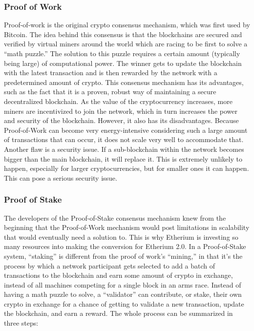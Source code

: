 \subsubsection{Proof of Work}

Proof-of-work is the original crypto consensus mechanism, which was first used by Bitcoin. The idea behind this consensus is that the blockchains are secured and verified by virtual miners around the world which are racing to be first to solve a “math puzzle.” The solution to this puzzle requires a certain amount (typically being large) of computational power. The winner gets to update the blockchain with the latest transaction and is then rewarded by the network with a predetermined amount of crypto. This consensus mechanism has its advantages, such as the fact that it is a proven, robust way of maintaining a secure decentralized blockchain. As the value of the cryptocurrency increases, more miners are incentivized to join the network, which in turn increases the power and security of the blockchain. However, it also has its disadvantages. Because Proof-of-Work can become very energy-intensive considering such a large amount of transactions that can occur, it does not scale very well to accommodate that. Another flaw is a security issue. If a sub-blockchain within the network becomes bigger than the main blockchain, it will replace it. This is extremely unlikely to happen, especially for larger cryptocurrencies, but for smaller ones it can happen. This can pose a serious security issue.

\subsubsection{Proof of Stake}

The developers of the Proof-of-Stake consensus mechanism knew from the beginning that the Proof-of-Work mechanism would post limitations in scalability that would eventually need a solution to. This is  why Etherium is investing so many resources into making the conversion for Etherium 2.0. In a Proof-of-Stake system, “staking” is different from the proof of work’s “mining,” in that it’s the process by which a network participant gets selected to add a batch of transactions to the blockchain and earn some amount of crypto in exchange, instead of all machines competing for a single block in an arms race. Instead of having a math puzzle to solve, a “validator” can contribute, or stake, their own crypto in exchange for a chance of getting to validate a new transaction, update the blockchain, and earn a reward. The whole process can be summarized in three steps:

